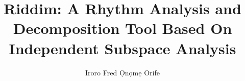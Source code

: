 \documentclass[12pt]{report}
\begin{document}

\title{Riddim: A Rhythm Analysis and Decomposition Tool Based On
  Independent Subspace Analysis}

\author{Iroro Fred {\d O}n{\d o}m{\d e} Orife}


\dedication{dedication}



\end{document}
